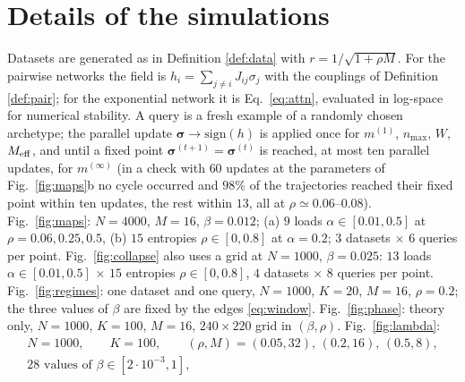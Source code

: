\documentclass[11pt,a4paper]{article}
\newcommand{\s}{\bm{\sigma}}
\newcommand{\Meff}{M_{\rm eff}}
\newcommand{\sgn}{\mathrm{sign}}
\begin{document}
\appendix
\section{Details of the simulations}
Datasets are generated as in Definition \ref{def:data} with $r=1/\sqrt{1+\rho M}$. For the pairwise networks the field is $h_i=\sum_{j\ne i}J_{ij}\sigma_j$ with the couplings of Definition \ref{def:pair}; for the exponential network it is Eq.\ \eqref{eq:attn}, evaluated in log-space for numerical stability. A query is a fresh example of a randomly chosen archetype; the parallel update $\s\to\sgn(h)$ is applied once for $m^{(1)}$, $n_{\max}$, $W$, $\Meff$, and until a fixed point $\s^{(t+1)}=\s^{(t)}$ is reached, at most ten parallel updates, for $m^{(\infty)}$ (in a check with $60$ updates at the parameters of Fig.\ \ref{fig:maps}b no cycle occurred and $98\%$ of the trajectories reached their fixed point within ten updates, the rest within $13$, all at $\rho\simeq0.06$--$0.08$). Fig.\ \ref{fig:maps}: $N=4000$, $M=16$, $\beta=0.012$; (a) $9$ loads $\alpha\in[0.01,0.5]$ at $\rho=0.06,0.25,0.5$, (b) $15$ entropies $\rho\in[0,0.8]$ at $\alpha=0.2$; $3$ datasets $\times$ $6$ queries per point. Fig.\ \ref{fig:collapse} also uses a grid at $N=1000$, $\beta=0.025$: $13$ loads $\alpha\in[0.01,0.5]$ $\times$ $15$ entropies $\rho\in[0,0.8]$, $4$ datasets $\times$ $8$ queries per point. Fig.\ \ref{fig:regimes}: one dataset and one query, $N=1000$, $K=20$, $M=16$, $\rho=0.2$; the three values of $\beta$ are fixed by the edges \eqref{eq:window}. Fig.\ \ref{fig:phase}: theory only, $N=1000$, $K=100$, $M=16$, $240\times220$ grid in $(\beta,\rho)$. Fig.\ \ref{fig:lambda}:
\begin{gather*}
N=1000,\qquad K=100,\qquad (\rho,M)=(0.05,32),\,(0.2,16),\,(0.5,8),\\
28\text{ values of }\beta\in[2\cdot10^{-3},1],
\end{gather*}
\end{document}

